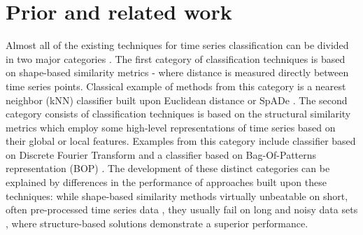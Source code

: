 \documentclass[conference]{IEEEtran}
\begin{document}
\section{Prior and related work} \label{prior}
Almost all of the existing techniques for time series classification can be divided 
in two major categories \cite{survey}. 
The first category of classification techniques is based on 
shape-based similarity metrics - where distance is measured directly between time 
series points. Classical example of methods from this category is a nearest neighbor 
(kNN) classifier built upon Euclidean distance \cite{1NN} or SpADe \cite{spade}. 
The second category consists of classification techniques is based on the 
structural similarity metrics which employ some high-level representations 
of time series based on their global or local features. 
Examples from this category include classifier based on Discrete Fourier Transform \cite{DFT}
and a classifier based on Bag-Of-Patterns representation (BOP) \cite{bag_patterns}. 
The development of these distinct categories can be explained by differences 
in the performance of approaches built upon these techniques: 
while shape-based similarity methods virtually unbeatable on short, 
often pre-processed time series data \cite{benchmark}, 
they usually fail on long and noisy data sets \cite{indexing},
where structure-based solutions demonstrate a superior performance. 


%
%
\end{document}
